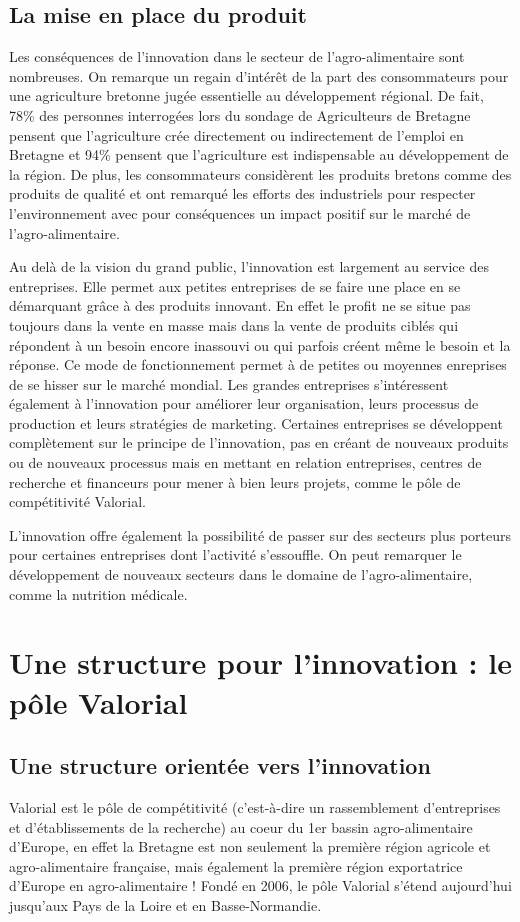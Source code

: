 \documentclass[a4paper,12pt]{report}
\begin{document}
		\subsection{La mise en place du produit}
		Les conséquences de l’innovation dans le secteur de l’agro-alimentaire sont nombreuses. On remarque un regain d’intérêt de la part des consommateurs pour une agriculture bretonne jugée essentielle au développement régional. De fait, 78\% des personnes interrogées lors du sondage de Agriculteurs de Bretagne pensent que l’agriculture crée directement ou indirectement de l’emploi en Bretagne et 94\% pensent que l’agriculture est indispensable au développement de la région\cite{AgriculteursDeBretagne}. De plus, les consommateurs considèrent les produits bretons comme des produits de qualité et ont remarqué les efforts des industriels pour respecter l’environnement avec pour conséquences un impact positif sur le marché de l’agro-alimentaire.

    Au delà de la vision du grand public, l’innovation est largement au service des entreprises. Elle permet aux petites entreprises de se faire une place en se démarquant grâce à des produits innovant. En effet le profit ne se situe pas toujours dans la vente en masse mais dans la vente de produits ciblés qui répondent à un besoin encore inassouvi ou qui parfois créent même le besoin et la réponse. Ce mode de fonctionnement permet à de petites ou moyennes enreprises de se hisser sur le marché mondial.
Les grandes entreprises s’intéressent également à l’innovation pour améliorer leur organisation, leurs processus de production et leurs stratégies de marketing.
Certaines entreprises se développent complètement sur le principe de l’innovation, pas en créant de nouveaux produits ou de nouveaux processus mais en mettant en relation entreprises, centres de recherche et financeurs pour mener à bien leurs projets, comme le pôle de compétitivité Valorial.

	L’innovation offre également la possibilité de passer sur des secteurs plus porteurs pour certaines entreprises dont l’activité s'essouffle. On peut remarquer le développement de nouveaux secteurs dans le domaine de l’agro-alimentaire, comme la nutrition médicale.
			
	\section{Une structure pour l'innovation : le pôle Valorial}
		
		\subsection{Une structure orientée vers l'innovation}
			Valorial est le pôle de compétitivité (c’est-à-dire un rassemblement d’entreprises et d’établissements de la recherche) au coeur du 1er bassin agro-alimentaire d’Europe\cite{SiteValorial}, en effet la Bretagne est non seulement la première région agricole et agro-alimentaire française, mais également la première région exportatrice d’Europe en agro-alimentaire\cite{RennesAtalante} ! Fondé en 2006, le pôle Valorial s’étend aujourd’hui jusqu’aux Pays de la Loire et en Basse-Normandie.
\end{document}

